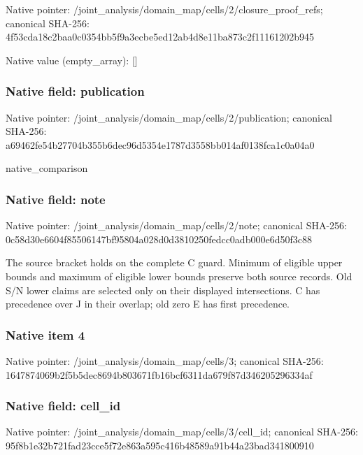 \documentclass[10pt,a4paper]{article}
\begin{document}
Native pointer: /joint\_analysis/domain\_m\allowbreak{}ap/cells/2/closure\_proof\allowbreak{}\_refs; canonical SHA-256: 4f53cda18c2baa0c0354bb5f\allowbreak{}9a3ecbe5ed12ab4d8e11ba87\allowbreak{}3c2f11161202b945



Native value (empty\_array): []



\subsubsection{Native field: publication}


Native pointer: /joint\_analysis/domain\_m\allowbreak{}ap/cells/2/publication; canonical SHA-256: a69462fe54b27704b355b6de\allowbreak{}c96d5354e1787d3558bb014a\allowbreak{}f0138fca1c0a04a0


native\_comparison


\subsubsection{Native field: note}


Native pointer: /joint\_analysis/domain\_map/cells/2/note; canonical SHA-256: 0c58d30e6604f85506147bf9\allowbreak{}5804a028d0d3810250fedcc0\allowbreak{}adb000e6d50f3c88


The source bracket holds on the complete C guard. Minimum of eligible upper bounds and maximum of eligible lower bounds preserve both source records. Old S/N lower claims are selected only on their displayed intersections. C has precedence over J in their overlap; old zero E has first precedence.


\subsubsection{Native item 4}


Native pointer: /joint\_analysis/domain\_map/cells/3; canonical SHA-256: 1647874069b2f5b5dec8694b\allowbreak{}803671fb16bcf6311da679f8\allowbreak{}7d346205296334af



\subsubsection{Native field: cell\_id}


Native pointer: /joint\_analysis/domain\_m\allowbreak{}ap/cells/3/cell\_id; canonical SHA-256: 95f8b1e32b721fad23cce5f7\allowbreak{}2e863a595c416b48589a91b4\allowbreak{}4a23bad341800910
\end{document}
